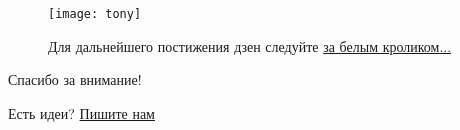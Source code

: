 \vspace*{\fill}
\begin{center}
    \begin{figure}[ht!]
    \centering
    \texttt{[image: tony]}
    \caption{Для дальнейшего постижения дзен следуйте \href{https://antoniii.github.io/dzen}{за белым кроликом...}}
\end{figure}
\end{center}
\vspace{2em}
\begin{center}
    \large 
    Спасибо за внимание!

    \vspace{2em}
    Есть идеи?
    \href{mailto:anto-kha0@rambler.ru}{Пишите нам}
\end{center}
\vfill
\pagestyle{empty}


